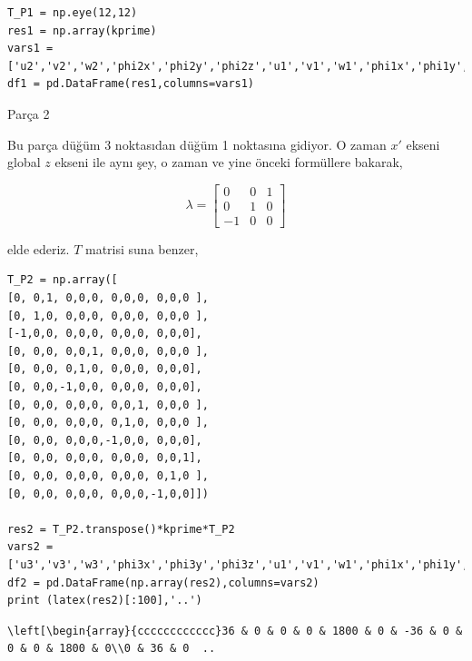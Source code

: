\documentclass[12pt,fleqn]{article}\usepackage{../../common}
\begin{document}
\begin{verbatim}
T_P1 = np.eye(12,12)
res1 = np.array(kprime)
vars1 = ['u2','v2','w2','phi2x','phi2y','phi2z','u1','v1','w1','phi1x','phi1y','phi1z']
df1 = pd.DataFrame(res1,columns=vars1)
\end{verbatim}

Parça 2

Bu parça düğüm 3 noktasıdan düğüm 1 noktasına gidiyor. O zaman $x'$ ekseni
global $z$ ekseni ile aynı şey, o zaman ve yine önceki formüllere bakarak,

$$
\lambda = \left[\begin{array}{ccc}
0 & 0 & 1 \\ 0 & 1 & 0 \\ -1 & 0 & 0
\end{array}\right]
$$

elde ederiz. $T$ matrisi suna benzer,

\begin{verbatim}
T_P2 = np.array([
[0, 0,1, 0,0,0, 0,0,0, 0,0,0 ],
[0, 1,0, 0,0,0, 0,0,0, 0,0,0 ],
[-1,0,0, 0,0,0, 0,0,0, 0,0,0],
[0, 0,0, 0,0,1, 0,0,0, 0,0,0 ],
[0, 0,0, 0,1,0, 0,0,0, 0,0,0],
[0, 0,0,-1,0,0, 0,0,0, 0,0,0],
[0, 0,0, 0,0,0, 0,0,1, 0,0,0 ],
[0, 0,0, 0,0,0, 0,1,0, 0,0,0 ],
[0, 0,0, 0,0,0,-1,0,0, 0,0,0],
[0, 0,0, 0,0,0, 0,0,0, 0,0,1],
[0, 0,0, 0,0,0, 0,0,0, 0,1,0 ],
[0, 0,0, 0,0,0, 0,0,0,-1,0,0]])

res2 = T_P2.transpose()*kprime*T_P2
vars2 = ['u3','v3','w3','phi3x','phi3y','phi3z','u1','v1','w1','phi1x','phi1y','phi1z']
df2 = pd.DataFrame(np.array(res2),columns=vars2)
print (latex(res2)[:100],'..')
\end{verbatim}

\begin{verbatim}
\left[\begin{array}{cccccccccccc}36 & 0 & 0 & 0 & 1800 & 0 & -36 & 0 & 0 & 0 & 1800 & 0\\0 & 36 & 0  ..
\end{verbatim}
\end{document}
